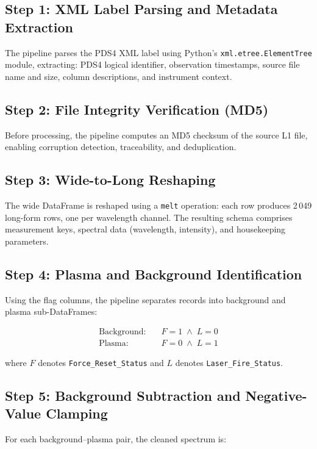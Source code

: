 \documentclass[a4paper,twocolumn,10pt]{article}
\begin{document}
\subsection{Step 1: XML Label Parsing and Metadata Extraction}

The pipeline parses the PDS4 XML label using Python's
\texttt{xml.etree.ElementTree} module, extracting: PDS4 logical
identifier, observation timestamps, source file name and size, column
descriptions, and instrument context.

\subsection{Step 2: File Integrity Verification (MD5)}

Before processing, the pipeline computes an MD5 checksum of the source
L1 file, enabling corruption detection, traceability, and deduplication.

\subsection{Step 3: Wide-to-Long Reshaping}

The wide DataFrame is reshaped using a \texttt{melt} operation: each
row produces 2\,049 long-form rows, one per wavelength channel.  The
resulting schema comprises measurement keys, spectral data
(wavelength, intensity), and housekeeping parameters.

\subsection{Step 4: Plasma and Background Identification}

Using the flag columns, the pipeline separates records into background
and plasma sub-DataFrames:

\begin{align}
\text{Background:}\quad & F = 1 \;\wedge\; L = 0 \\
\text{Plasma:}\quad & F = 0 \;\wedge\; L = 1
\end{align}

where $F$ denotes \texttt{Force\_Reset\_Status} and $L$ denotes
\texttt{Laser\_Fire\_Status}.

\subsection{Step 5: Background Subtraction and Negative-Value Clamping}

For each background--plasma pair, the cleaned spectrum is:
\end{document}

